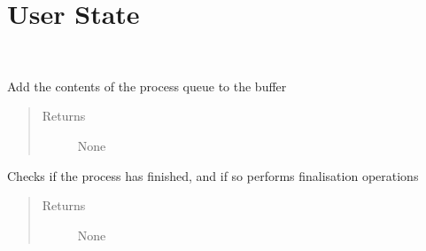 \documentclass[letterpaper,10pt,english]{sphinxmanual}
\begin{document}
\section{User State}
\label{\detokenize{funcs:user-state}}

\begin{fulllineitems}
\label{\detokenize{funcs:userstate.userState}}~

\begin{fulllineitems}
\label{\detokenize{funcs:userstate.userState.appendQueue}}
Add the contents of the process queue to the buffer
\begin{quote}\begin{description}
\item[{Returns}] \leavevmode
None

\end{description}\end{quote}

\end{fulllineitems}


\begin{fulllineitems}
\label{\detokenize{funcs:userstate.userState.finalise}}
Checks if the process has finished, and if so performs finalisation operations
\begin{quote}\begin{description}
\item[{Returns}] \leavevmode
None

\end{description}\end{quote}

\end{fulllineitems}


\end{fulllineitems}
\end{document}
